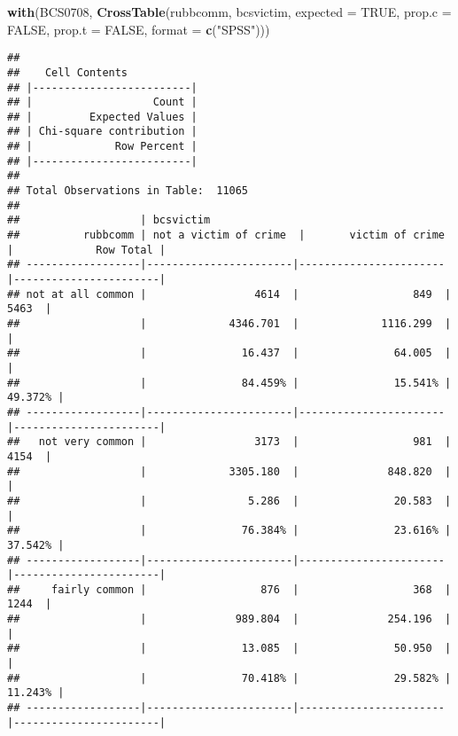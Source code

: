 \documentclass[
]{book}
\newenvironment{Shaded}{\begin{snugshade}}{\end{snugshade}}
\newcommand{\AttributeTok}[1]{\textcolor[rgb]{0.13,0.29,0.53}{#1}}
\newcommand{\ConstantTok}[1]{\textcolor[rgb]{0.56,0.35,0.01}{#1}}
\newcommand{\FunctionTok}[1]{\textcolor[rgb]{0.13,0.29,0.53}{\textbf{#1}}}
\newcommand{\NormalTok}[1]{#1}
\newcommand{\StringTok}[1]{\textcolor[rgb]{0.31,0.60,0.02}{#1}}
\begin{document}
\begin{Shaded}
\begin{Highlighting}[]
\FunctionTok{with}\NormalTok{(BCS0708, }\FunctionTok{CrossTable}\NormalTok{(rubbcomm, bcsvictim, }\AttributeTok{expected =} \ConstantTok{TRUE}\NormalTok{, }\AttributeTok{prop.c =} \ConstantTok{FALSE}\NormalTok{, }\AttributeTok{prop.t =} \ConstantTok{FALSE}\NormalTok{, }\AttributeTok{format =} \FunctionTok{c}\NormalTok{(}\StringTok{"SPSS"}\NormalTok{)))}
\end{Highlighting}
\end{Shaded}

\begin{verbatim}
## 
##    Cell Contents
## |-------------------------|
## |                   Count |
## |         Expected Values |
## | Chi-square contribution |
## |             Row Percent |
## |-------------------------|
## 
## Total Observations in Table:  11065 
## 
##                   | bcsvictim 
##          rubbcomm | not a victim of crime  |       victim of crime  |             Row Total | 
## ------------------|-----------------------|-----------------------|-----------------------|
## not at all common |                 4614  |                  849  |                 5463  | 
##                   |             4346.701  |             1116.299  |                       | 
##                   |               16.437  |               64.005  |                       | 
##                   |               84.459% |               15.541% |               49.372% | 
## ------------------|-----------------------|-----------------------|-----------------------|
##   not very common |                 3173  |                  981  |                 4154  | 
##                   |             3305.180  |              848.820  |                       | 
##                   |                5.286  |               20.583  |                       | 
##                   |               76.384% |               23.616% |               37.542% | 
## ------------------|-----------------------|-----------------------|-----------------------|
##     fairly common |                  876  |                  368  |                 1244  | 
##                   |              989.804  |              254.196  |                       | 
##                   |               13.085  |               50.950  |                       | 
##                   |               70.418% |               29.582% |               11.243% | 
## ------------------|-----------------------|-----------------------|-----------------------|

\end{verbatim}
\end{document}
